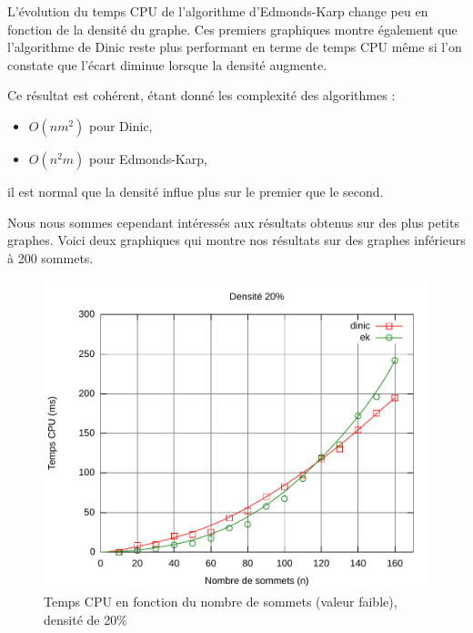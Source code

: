 \FloatBarrier

L'évolution du temps CPU de l'algorithme d'Edmonds-Karp change peu en fonction de la densité du graphe. Ces premiers graphiques montre également que l'algorithme de Dinic reste plus performant en terme de temps CPU même si l'on constate que l'écart diminue lorsque la densité augmente.

Ce résultat est cohérent, étant donné les complexité des algorithmes : 
\begin{itemize}
\item $O(nm^2)$ pour Dinic,
\item $O(n^ 2m)$ pour Edmonds-Karp,
\end{itemize}
il est normal que la densité influe plus sur le premier que le second.

Nous nous sommes cependant intéressés aux résultats obtenus sur des plus petits graphes. Voici deux graphiques qui montre nos résultats sur des graphes inférieurs à 200 sommets.

\begin{figure}[h!]
\begin{center}
\includegraphics[width=\textwidth]{files/c20_low}
\end{center}
\caption{Temps CPU en fonction du nombre de sommets (valeur faible), densité de 20\%}
\end{figure}

